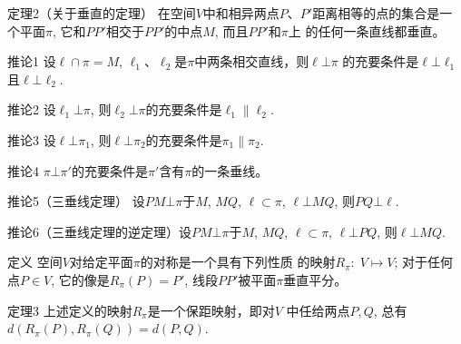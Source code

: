 \begin{blk}
    {定理2（关于垂直的定理）}
在空间$V$中和相异两点$P$、$P'$距离相等的点的集合是一
个平面$\pi$, 它和$PP'$相交于$PP'$的中点$M$, 而且$PP'$和$\pi$上
的任何一条直线都垂直。
\end{blk}

\begin{blk}
{推论1} 设$\ell\cap \pi=M$, $\ell_1$、$\ell_2$是$\pi$中两条相交直线，则$\ell\bot\pi$
的充要条件是$\ell\bot \ell_1$且$\ell\bot \ell_2$.
\end{blk}

\begin{blk}
{推论2}
设$\ell_1\bot\pi$, 则$\ell_2\bot\pi$的充要条件是$\ell_1\parallel \ell_2$.
\end{blk}

\begin{blk}
{推论3}
设$\ell\bot \pi_1$, 则$\ell\bot \pi_2$的充要条件是$\pi_1\parallel \pi_2$.
\end{blk}

\begin{blk}
{推论4}
$\pi\bot \pi'$的充要条件是$\pi'$含有$\pi$的一条垂线。

\end{blk}

\begin{blk}
    {推论5（三垂线定理）}
    设$PM\bot \pi$于$M$, $MQ$, $\ell\subset \pi$, 
$\ell\bot MQ$, 则$PQ\bot \ell$.
\end{blk}

\begin{blk}
{推论6（三垂线定理的逆定理）}设$PM\bot \pi$于$M$, $MQ$, 
$\ell\subset \pi$, $\ell\bot PQ$, 则$\ell\bot MQ$.
\end{blk}

\begin{blk}
    {定义} 空间$V$对给定平面$\pi$的对称是一个具有下列性质
的映射$R_{\pi}:\; V\mapsto V$; 对于任何点$P\in V$, 它的像是$R_{\pi}(P)=P'$, 
线段$PP'$被平面$\pi$垂直平分。
\end{blk}

\begin{blk}
    {定理3} 上述定义的映射$R_{\pi}$是一个保距映射，即对$V$
中任给两点$P,Q$, 总有$d(R_{\pi}(P),R_{\pi}(Q))=d(P,Q)$.
\end{blk}

